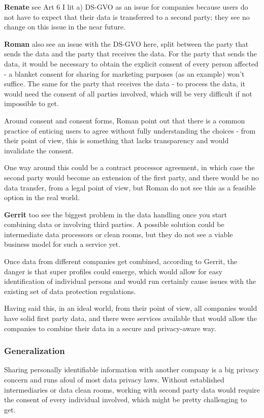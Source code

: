 \textbf{Renate} see Art 6 I lit a) DS-GVO as an issue for companies because users do not have to expect that their data is transferred to a second party; they see no change on this issue in the near future.

\textbf{Roman} also see an issue with the DS-GVO here, split between the party that sends the data and the party that receives the data. For the party that sends the data, it would be necessary to obtain the explicit consent of every person affected - a blanket consent for sharing for marketing purposes (as an example) won't suffice. The same for the party that receives the data - to process the data, it would need the consent of all parties involved, which will be very difficult if not impossible to get.

Around consent and consent forms, Roman point out that there is a common practice of enticing users to agree without fully understanding the choices - from their point of view, this is something that lacks transparency and would invalidate the consent.

One way around this could be a contract processor agreement, in which case the second party would become an extension of the first party, and there would be no data transfer, from a legal point of view, but Roman do not see this as a feasible option in the real world.

\textbf{Gerrit} too see the biggest problem in the data handling once you start combining data or involving third parties. A possible solution could be intermediate data processors or clean rooms, but they do not see a viable business model for such a service yet.

Once data from different companies get combined, according to Gerrit, the danger is that super profiles could emerge, which would allow for easy identification of individual persons and would run certainly cause issues with the existing set of data protection regulations.

Having said this, in an ideal world, from their point of view, all companies would have solid first party data, and there were services available that would allow the companies to combine their data in a secure and privacy-aware way. 

\subsubsection{Generalization}

Sharing personally identifiable information with another company is a big privacy concern and runs afoul of most data privacy laws. Without established intermediaries or data clean rooms, working with second party data would require the consent of every individual involved, which might be pretty challenging to get.


